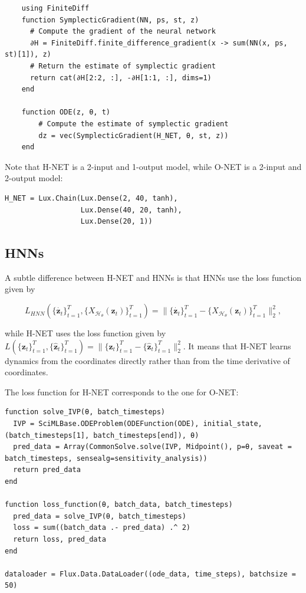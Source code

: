 \documentclass[
	parskip, 			   %
	twoside, 			   %
	DIV=14, 			   %
	BCOR=15.0mm, 		   %
	headsepline, 		   %
	open=right, 		   %
	captions=tableheading, %
	bibliography=totoc,    %
	numbers=noenddot       %
]{scrreprt}
\begin{document}
\begin{verbatim}
    using FiniteDiff
    function SymplecticGradient(NN, ps, st, z) 
      # Compute the gradient of the neural network
      ∂H = FiniteDiff.finite_difference_gradient(x -> sum(NN(x, ps, st)[1]), z)
      # Return the estimate of symplectic gradient
      return cat(∂H[2:2, :], -∂H[1:1, :], dims=1)
    end

    function ODE(z, θ, t)
        # Compute the estimate of symplectic gradient
        dz = vec(SymplecticGradient(H_NET, θ, st, z))
    end
\end{verbatim}

Note that H-NET is a 2-input and 1-output model, while O-NET is a 2-input and 2-output model:

\begin{verbatim}
H_NET = Lux.Chain(Lux.Dense(2, 40, tanh),
                  Lux.Dense(40, 20, tanh),
                  Lux.Dense(20, 1))
\end{verbatim}

\subsection{HNNs}
A subtle difference between H-NET and HNNs is that HNNs use the loss function given by

\begin{equation}
    \label{eq:loss_HNNs}
    L_{HNN}(\{ \dot{\mathbf{z}_{t}} \}_{t=1}^{T}, \{ X_{\mathcal{H}_{\theta}}(\mathbf{z}_{t}) \}_{t=1}^{T}) = \lVert \{ \dot{\mathbf{z}_{t}} \}_{t=1}^{T} - \{ X_{\mathcal{H}_{\theta}}(\mathbf{z}_{t}) \}_{t=1}^{T} \rVert_{2}^{2},
\end{equation}

while H-NET uses the loss function given by $ L(\{ \mathbf{z}_{t} \}_{t=1}^{T}, \{ \mathbf{\hat{z}}_{t} \}_{t=1}^{T}) = \lVert \{ \mathbf{z}_{t} \}_{t=1}^{T} - \{ \mathbf{\hat{z}}_{t} \}_{t=1}^{T} \rVert_{2}^{2} $. It means that H-NET learns dynamics from the coordinates directly rather than from the time derivative of coordinates.

The loss function for H-NET corresponds to the one for O-NET:

\begin{verbatim}
function solve_IVP(θ, batch_timesteps)
  IVP = SciMLBase.ODEProblem(ODEFunction(ODE), initial_state, (batch_timesteps[1], batch_timesteps[end]), θ)
  pred_data = Array(CommonSolve.solve(IVP, Midpoint(), p=θ, saveat = batch_timesteps, sensealg=sensitivity_analysis))
  return pred_data
end

function loss_function(θ, batch_data, batch_timesteps)
  pred_data = solve_IVP(θ, batch_timesteps)
  loss = sum((batch_data .- pred_data) .^ 2)
  return loss, pred_data
end

dataloader = Flux.Data.DataLoader((ode_data, time_steps), batchsize = 50)
\end{verbatim}
\end{document}

